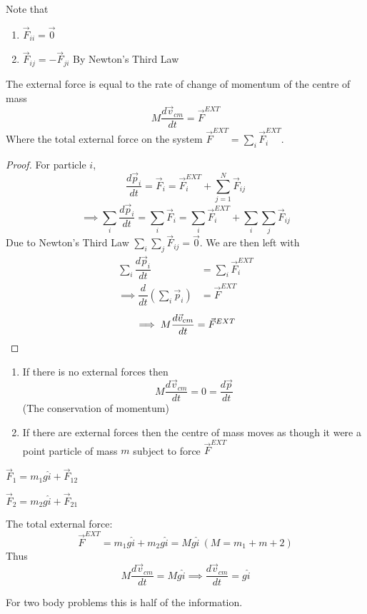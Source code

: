 Note that
\begin{enumerate}
\item $\vec{F}_{ii} = \vec{0}$
\item $\vec{F}_{ij} = -\vec{F}_{ji}$ By Newton's Third Law
\end{enumerate}

\begin{theorem}
The external force is equal to the rate of change of momentum of the centre of mass
	\[M\frac{d\vec{v}_{cm}}{dt} = \vec{F}^{EXT}\]
	Where the total external force on the system $\vec{F}^{EXT} = \sum_i\vec{F}_i^{EXT}$.
\end{theorem}
\begin{proof}

For particle $i$, \[\dfrac{d\vec{p}_i}{dt} = \vec{F}_i = \vec{F}_i^{EXT} + \sum_{j=1}^N\vec{F}_{ij}\] 
\[\implies \sum_i \dfrac{d\vec{p}_i}{dt} = \sum_i\vec{F}_i = \sum_i\vec{F}_i^{EXT} + \sum_i\sum_j\vec{F}_{ij} \]
Due to Newton's Third Law $\sum_i\sum_j\vec{F}_{ij} = \vec{0}$. We are then left with 
\[\begin{aligned}\sum_i\dfrac{d\vec{p}_i}{dt} &= \sum_i\vec{F}_i^{EXT}\\
\implies \dfrac{d}{dt}(\sum_i \vec{p}_i) &= \vec{F}^{EXT}\end{aligned}
\]
\[\implies M\frac{d\vec{v}_{cm}}{dt} = \vec{F}^{EXT}\qedhere\]
\end{proof}

\begin{enumerate}
\item If there is no external forces then 
\[M \frac{d\vec{v}_{cm}}{dt} = 0 = \frac{d\vec{p}}{dt}\]
(The conservation of momentum)
\item	If there are external forces then the centre of mass moves as though it were a point particle of mass $m$ subject to force $\vec{F}^{EXT}$
\end{enumerate}


\vspace*{50pt}

$\vec{F}_1 = m_1g \hat{i} + \vec{F}_{12}$

$\vec{F}_2 = m_2g \hat{i} + \vec{F}_{21}$

The total external force:
\[\vec{F}^{EXT} = m_1g\hat{i} + m_2g\hat{i} = Mg\hat{i} ~(M = m_1 + m+2)\]
Thus
\[M\frac{d\vec{v}_{cm}}{dt} = Mg\hat{i} \implies \frac{d\vec{v}_{cm}}{dt} = g\hat{i}\]

For two body problems this is half of the information.

